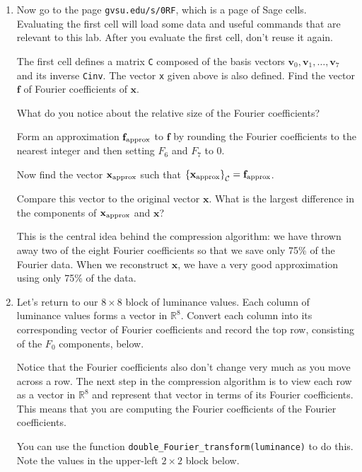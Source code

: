 \documentclass[12pt]{article}
\newcommand{\vs}[1]{\vspace{#1in}}
\newcommand{\fvec}{{\mathbf f}}
\newcommand{\vvec}{{\mathbf v}}
\newcommand{\xvec}{{\mathbf x}}
\newcommand{\real}{{\mathbb R}}
\newcommand{\ccal}{{\cal C}}
\newcommand{\coords}[2]{\left\{#1\right\}_{#2}}
\begin{document}
\begin{enumerate}
    \vs{1}

  \item Now go to the page {\tt gvsu.edu/s/0RF}, which is a page of
    Sage cells.  Evaluating the first cell will load some data and
    useful commands that are relevant to this lab.  After you evaluate
    the first cell, don't reuse it again.

    \newpage
    The first cell defines a matrix {\tt C} composed of
    the basis vectors $\vvec_0, \vvec_1,\ldots,\vvec_7$ and its
    inverse {\tt Cinv}.  The vector {\tt x}
    given above is also defined.  Find the vector $\fvec$ of Fourier
    coefficients of $\xvec$.

    \vs{1}
    What do you notice about the relative size of the Fourier
    coefficients?

    \vs{1}
    Form an approximation $\fvec_{\rm approx}$ to $\fvec$ by rounding
    the Fourier coefficients to the nearest integer and then setting
    $F_6$ and $F_7$ to 0.

    \vs{1}
    Now find the vector $\xvec_{\rm approx}$
    such that $\coords{\xvec_{\rm approx}}{\ccal} = \fvec_{\rm
      approx}$.

    \vs{1}
    Compare this vector to the original vector $\xvec$.  What is the
    largest difference in the components of $\xvec_{\rm approx}$ and
    $\xvec$?

    \vs{1}
    This is the central idea behind the compression algorithm:  we
    have thrown away two of the eight Fourier coefficients so that we
    save only 75\% of the Fourier data.  When we reconstruct $\xvec$,
    we have a very good approximation using only 75\% of the data.

    \newpage

  \item Let's return to our $8\times8$ block of luminance values.
    Each column of luminance values forms a vector in $\real^8$.
    Convert each column into its corresponding vector of Fourier
    coefficients and record the top row, consisting of the $F_0$
    components, below.

    \vs{1}
    Notice that the Fourier coefficients also don't change very much
    as you move across a row.  The next step in the compression
    algorithm is to view each row as a vector in $\real^8$ and
    represent that vector in terms of its Fourier coefficients.  This
    means that you are computing the Fourier coefficients of the
    Fourier coefficients.

    You can use the function {\tt double\_Fourier\_transform(luminance)}
    to do this.  Note the values in the upper-left $2\times2$ block
    below.


\end{enumerate}
\end{document}
